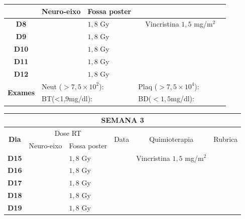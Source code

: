 \documentclass[11pt,a4paper,oldfontcommands]{memoir}
\begin{document}
\begin{center}
\begin{table}[H]
\begin{tabular}{p{1cm}p{2cm}|p{2cm}|p{1cm}|p{4cm}|p{3cm}}
    \cline{2-3}
    \multicolumn{1}{c|}{\multirow{1}{*}{}}&{Neuro-eixo}&{Fossa poster}&& \\
	\hline
	\multicolumn{1}{c|}{\multirow{1}{*}{\textbf{D8}}}&\multicolumn{1}{c|}{}&{\(1,8\) Gy}&&{Vincristina \(1,5\) mg/m\(^2\)}&\\
    \multicolumn{1}{c|}{\multirow{1}{*}{\textbf{D9}}}&\multicolumn{1}{c|}{}&{\(1,8\) Gy}&&{}&\\
    \multicolumn{1}{c|}{\multirow{1}{*}{\textbf{D10}}}&\multicolumn{1}{c|}{}&{\(1,8\) Gy}&&{}&\\
    \multicolumn{1}{c|}{\multirow{1}{*}{\textbf{D11}}}&\multicolumn{1}{c|}{}&{\(1,8\) Gy}&&{}&\\
    \multicolumn{1}{c|}{\multirow{1}{*}{\textbf{D12}}}&\multicolumn{1}{c|}{}&{\(1,8\) Gy}&&{}&\\
    \hline
    \multicolumn{1}{c|}{\multirow{2}{*}{\textbf{Exames}}}&\multicolumn{2}{l|}{Neut (\(>7,5\times10^2\)):}&\multicolumn{2}{l|}{Plaq (\(>7,5\times10^4\)):}&\\
    \cline{2-6}
    \multicolumn{1}{c|}{\multirow{2}{*}{{}}}&\multicolumn{2}{l|}{BT(<1,9mg/dl):}&\multicolumn{2}{l|}{BD(\(<1,5\)mg/dl):}&
    \\
    \hline
\end{tabular}
\end{table}
\begin{table}[H]
\begin{tabular}{p{1cm}p{2cm}|p{2cm}|p{1cm}|p{4cm}|p{3cm}}
	\hline
	\multicolumn{6}{c}{\textbf{SEMANA 3}}\\
\hline
    \multicolumn{1}{c|}{\multirow{2}{*}{\textbf{Dia}}}&\multicolumn{2}{c|}{Dose RT}&\multicolumn{1}{c|}{\multirow{2}{*}{Data}}&\multicolumn{1}{c|}{\multirow{2}{*}{Quimioterapia}}&\multicolumn{1}{c}{\multirow{2}{*}{Rubrica}} \\
    \cline{2-3}
    \multicolumn{1}{c|}{\multirow{1}{*}{}}&{Neuro-eixo}&{Fossa poster}&& \\
	\hline
	\multicolumn{1}{c|}{\multirow{1}{*}{\textbf{D15}}}&\multicolumn{1}{c|}{}&{\(1,8\) Gy}&&{Vincristina \(1,5\) mg/m\(^2\)}&\\
    \multicolumn{1}{c|}{\multirow{1}{*}{\textbf{D16}}}&\multicolumn{1}{c|}{}&{\(1,8\) Gy}&&{}&\\    \multicolumn{1}{c|}{\multirow{1}{*}{\textbf{D17}}}&\multicolumn{1}{c|}{}&{\(1,8\) Gy}&&{}&\\
    \multicolumn{1}{c|}{\multirow{1}{*}{\textbf{D18}}}&\multicolumn{1}{c|}{}&{\(1,8\) Gy}&&{}&\\
    \multicolumn{1}{c|}{\multirow{1}{*}{\textbf{D19}}}&\multicolumn{1}{c|}{}&{\(1,8\) Gy}&&{}&\\

\end{tabular}
\end{table}
\end{center}
\end{document}
